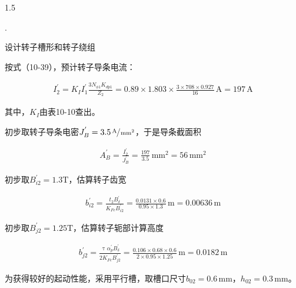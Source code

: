 \documentclass[a4paper,11pt]{ctexart}
\newcommand{\A}{\,\text{A}}
\newcommand{\m}{\,\text{m}}
\newcommand{\mm}{\,\text{mm}}
\newcommand{\T}{\text{T}}
\newenvironment{shrinkeq}[2]
{
	\bgroup
	\addtolength\abovedisplayshortskip{#1}
	\addtolength\abovedisplayskip{#1}
	\addtolength\belowdisplayshortskip{#2}
	\addtolength\belowdisplayskip{#2}
}
{
	\egroup
	\ignorespacesafterend
}
\newcounter{designitem}
\newcommand{\entry}
{
	\vspace{0.5em}
	\par
	\stepcounter{designitem}
	\thedesignitem.
}
\begin{document}
\begin{spacing}{1.5}
\entry
设计转子槽形和转子绕组
\par
按式（10-39），预计转子导条电流：
\begin{shrinkeq}{-1.5ex}{-1.5ex}
	\begin{align}
	I_{2}^{'} = K_{I}I_{1}^{'}\frac{3N_{\phi 1}K_{dp1}}{Z_2} =0.89\times 1.803\times \frac{3\times 708\times 0.927}{16}\A = 197\A
	\end{align}
\end{shrinkeq}
其中，$K_{I}$由表10-10查出。
\par
初步取转子导条电密$J_{B}^{'} = 3.5\sfrac{\A}{\mm^2}$，于是导条截面积
\begin{shrinkeq}{-1.5ex}{-1ex}
	\begin{align}
	A_{B}^{'}=\frac{I_{2}^{'}}{J_{B}^{'}} = \frac{197}{3.5}\mm^2 = 56\mm^2
	\end{align}
\end{shrinkeq}
\par
初步取$B_{i2}^{'} = 1.3\T$，估算转子齿宽
\begin{shrinkeq}{-1.5ex}{-1ex}
	\begin{align}
	b_{i2}^{'} = \frac{t_2B_{\delta}^{'}}{K_{Fe}B_{i2}^{'}}=\frac{0.0131\times 0.6}{0.95\times 1.3}\m = 0.00636\m
	\end{align}
\end{shrinkeq}
初步取$B_{j2}^{'} = 1.25\T$，估算转子轭部计算高度
\begin{shrinkeq}{-1.5ex}{-1.5ex}
	\begin{align}
	b_{j2}^{'} = \frac{\uptau \alpha_{p}^{'}B_{\delta}^{'}}{2K_{Fe}B_{j2}^{'}}=\frac{0.106\times 0.68\times 0.6}{2\times 0.95\times 1.25}\m = 0.0182\m
	\end{align}
\end{shrinkeq}
为获得较好的起动性能，采用平行槽，取槽口尺寸$b_{02} = 0.6\mm$，$h_{02} = 0.3\mm$。


\end{spacing}
\end{document}
